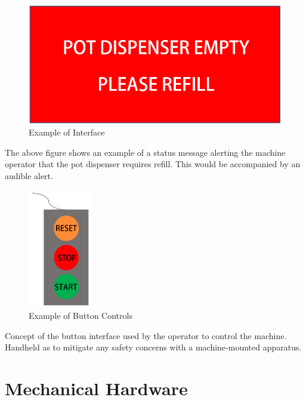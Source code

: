 \documentclass[12pt, titlepage]{article}
\begin{document}
\begin{figure}[H]
  \centering
\includegraphics{interface1.png}
\caption{Example of Interface}
  \label{fig:interface1}
\end{figure}
The above figure shows an example of a status message alerting the machine operator that the pot 
dispenser requires refill. This would be accompanied by an audible alert.

\begin{figure}[H]
  \centering
\includegraphics[width=0.25\textwidth]{interface2.png}
\caption{Example of Button Controls}
  \label{fig:interface2}
\end{figure}
Concept of the button interface used by the operator to control the machine. 
Handheld as to mitigate any safety concerns with a machine-mounted apparatus.

\section{Mechanical Hardware}
\end{document}
